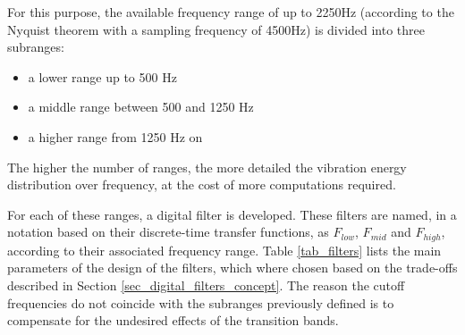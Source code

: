 \documentclass[conference]{IEEEtran}
\begin{document}
For this purpose, the available frequency range of up to 2250Hz (according to the Nyquist theorem with a sampling frequency of 4500Hz) is divided into three subranges:

\begin{itemize}
	\item a lower range up to 500 Hz
	\item a middle range between 500 and 1250 Hz
	\item a higher range from 1250 Hz on
\end{itemize}

The higher the number of ranges, the more detailed the vibration energy distribution over frequency, at the cost of more computations required.

For each of these ranges, a digital filter is developed. These filters are named, in a notation based on their discrete-time transfer functions, as $F_{low}$, $F_{mid}$ and $F_{high}$, according to their associated frequency range. Table \ref{tab_filters} lists the main parameters of the design of the filters, which where chosen based on the trade-offs described in Section \ref{sec_digital_filters_concept}. The reason the cutoff frequencies do not coincide with the subranges previously defined is to compensate for the undesired effects of the transition bands.


\end{document}
